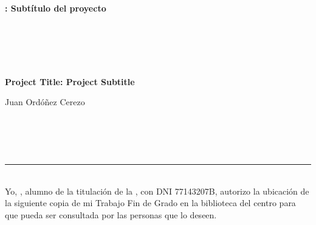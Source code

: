 \chapter*{}



\cleardoublepage
\thispagestyle{empty}

\begin{center}
{\large\bfseries \myTitle: Subtítulo del proyecto}\\
\end{center}
\begin{center}
\myName\\
\end{center}

\\

\vspace{0.7cm}
\\


\cleardoublepage


\thispagestyle{empty}


\begin{center}
{\large\bfseries Project Title: Project Subtitle}\\
\end{center}
\begin{center}
Juan Ordóñez Cerezo\\
\end{center}

\\

\vspace{0.7cm}
\\

\chapter*{}
\thispagestyle{empty}

\noindent\rule[-1ex]{\textwidth}{2pt}\\[4.5ex]

Yo, \textbf{\myName}, alumno de la titulación \myDegree de la \textbf{\myFaculty}, con DNI 77143207B, autorizo la ubicación de la siguiente copia de mi Trabajo Fin de Grado en la biblioteca del centro para que pueda ser consultada por las personas que lo deseen.

